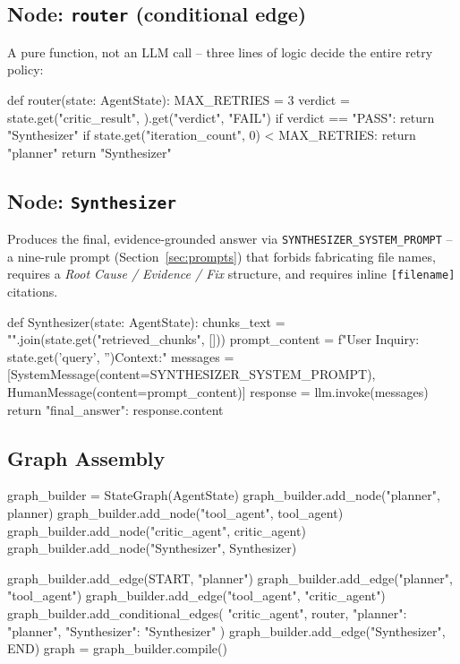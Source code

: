\documentclass[11pt,a4paper]{article}
\begin{document}
\subsection{Node: \texttt{router} (conditional edge)}
A pure function, not an LLM call -- three lines of logic decide the entire
retry policy:

\begin{pycode}
def router(state: AgentState):
    MAX_RETRIES = 3
    verdict = state.get("critic_result", {}).get("verdict", "FAIL")
    if verdict == "PASS":
        return "Synthesizer"
    if state.get("iteration_count", 0) < MAX_RETRIES:
        return "planner"
    return "Synthesizer"
\end{pycode}

\subsection{Node: \texttt{Synthesizer}}
Produces the final, evidence-grounded answer via \texttt{SYNTHESIZER\_SYSTEM\_PROMPT}
-- a nine-rule prompt (Section~\ref{sec:prompts}) that forbids fabricating
file names, requires a \textit{Root Cause / Evidence / Fix} structure, and
requires inline \texttt{[filename]} citations.

\begin{pycode}
def Synthesizer(state: AgentState):
    chunks_text = "\n\n".join(state.get("retrieved_chunks", []))
    prompt_content = f"User Inquiry: {state.get('query', '')}\n\nRetrieved Context:"
    messages = [SystemMessage(content=SYNTHESIZER_SYSTEM_PROMPT), HumanMessage(content=prompt_content)]
    response = llm.invoke(messages)
    return {"final_answer": response.content}
\end{pycode}

\subsection{Graph Assembly}

\begin{pycode}
graph_builder = StateGraph(AgentState)
graph_builder.add_node("planner", planner)
graph_builder.add_node("tool_agent", tool_agent)
graph_builder.add_node("critic_agent", critic_agent)
graph_builder.add_node("Synthesizer", Synthesizer)

graph_builder.add_edge(START, "planner")
graph_builder.add_edge("planner", "tool_agent")
graph_builder.add_edge("tool_agent", "critic_agent")
graph_builder.add_conditional_edges(
    "critic_agent", router, {"planner": "planner", "Synthesizer": "Synthesizer"}
)
graph_builder.add_edge("Synthesizer", END)
graph = graph_builder.compile()
\end{pycode}
\end{document}
